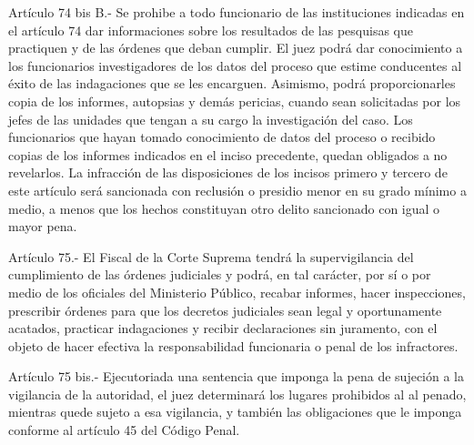     Artículo 74 bis B.- Se prohibe a todo funcionario de las instituciones indicadas en el artículo 74 dar informaciones sobre los resultados de las pesquisas que practiquen y de las órdenes que deban cumplir.
    El juez podrá dar conocimiento a los funcionarios investigadores de los datos del proceso que estime conducentes al éxito de las indagaciones que se les encarguen.  Asimismo, podrá proporcionarles copia de los informes, autopsias y demás pericias, cuando sean solicitadas por los jefes de las unidades que tengan a su cargo la investigación del caso.
    Los funcionarios que hayan tomado conocimiento de datos del proceso o recibido copias de los informes indicados en el inciso precedente, quedan obligados a no revelarlos.
    La infracción de las disposiciones de los incisos primero y tercero de este artículo será sancionada con reclusión o presidio menor en su grado mínimo a medio, a menos que los hechos constituyan otro delito sancionado con igual o mayor pena.

    Artículo 75.- El Fiscal de la Corte Suprema tendrá la supervigilancia del cumplimiento de las órdenes judiciales y podrá, en tal carácter, por sí o por medio de los oficiales del Ministerio Público, recabar informes, hacer inspecciones, prescribir órdenes para que los decretos judiciales sean legal y oportunamente acatados, practicar indagaciones y recibir declaraciones sin juramento, con el objeto de hacer efectiva la responsabilidad funcionaria o penal de los infractores.

    Artículo 75 bis.- Ejecutoriada una sentencia que imponga la pena de sujeción a la vigilancia de la autoridad, el juez determinará los lugares prohibidos al al penado, mientras quede sujeto a esa vigilancia, y también las obligaciones que le imponga conforme al artículo 45 del Código Penal.

